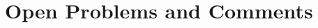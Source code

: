 \documentclass[10pt, a4]{amsart}
\theoremstyle{plain}
\theoremstyle{definition}
\theoremstyle{remark}
\numberwithin{equation}{section}
\begin{document}






\section{Open Problems and Comments}\label{s8}  
\end{document}
